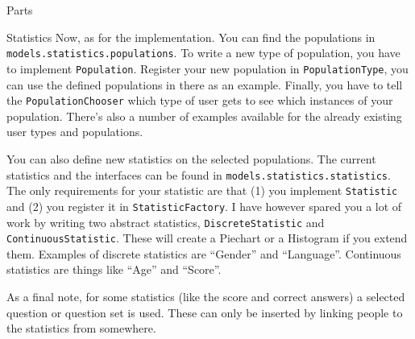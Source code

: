 \documentclass[]{article}
\begin{document}
\begin{section}{Parts}
\begin{subsection}{Statistics}
        Now, as for the implementation. You can find the populations in
        \texttt{models.statistics.populations}. To write a new type of
        population, you have to implement \texttt{Population}. Register your new
        population in \texttt{PopulationType}, you can use the defined
        populations in there as an example. Finally, you have to tell the
        \texttt{PopulationChooser} which type of user gets to see which
        instances of your population. There's also a number of examples available
        for the already existing user types and populations.

        You can also define new statistics on the selected populations. The
        current statistics and the interfaces can be found in
        \texttt{models.statistics.statistics}. The only requirements for your
        statistic are that (1) you implement \texttt{Statistic} and (2) you
        register it in \texttt{StatisticFactory}. I have however spared you a
        lot of work by writing two abstract statistics,
        \texttt{DiscreteStatistic} and \texttt{ContinuousStatistic}. These will
        create a Piechart or a Histogram if you extend them. Examples of
        discrete statistics are ``Gender'' and ``Language''. Continuous
        statistics are things like ``Age'' and ``Score''.

        As a final note, for some statistics (like the score and correct
        answers) a selected question or question set is used. These can only be
        inserted by linking people to the statistics from somewhere.

    \end{subsection}
\end{section}
\end{document}
